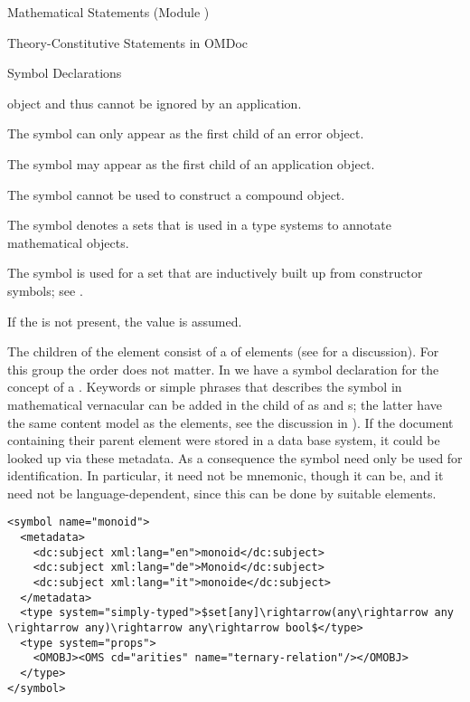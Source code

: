 \begin{tchapter}[id=statements,short=Mathematical Statements]{Mathematical Statements (Module {})}
\begin{tsection}[id=definitions]{Theory-Constitutive Statements in OMDoc}
\begin{tsubsection}[id=symbol-dec]{Symbol Declarations}
\begin{description}
    {\openmath} object and thus cannot be ignored by an application.
  \item[{\attval{error}{role}{symbol}}] The symbol can only appear as the first child of
    an {\openmath} error object.
  \item[{\attval{application}{role}{symbol}}] The symbol may appear as the first child of
    an application object.
  \item[{\attval{constant}{role}{symbol}}] The symbol cannot be used to construct a
    compound object.
  \item[{\attval{type}{role}{symbol}}] The symbol denotes a sets that is used in a type
    systems to annotate mathematical objects.
  \item[{\attval{sort}{role}{symbol}}] The symbol is used for a set that are inductively
    built up from constructor symbols; see {}.
  \end{description}
  If the {} is not present, the value
  {} is assumed.

  The children of the {} element consist of a
  {} of {} elements (see
  {} for a discussion). For this group the order does not matter.
  In {} we have a symbol declaration for the concept of a
  {}.  Keywords or simple phrases that describes the symbol in
  mathematical vernacular can be added in the {} child of
  {} as {} and
  {s}; the latter have the same content model as the
  {} elements, see the discussion in {}). If the document
  containing their parent {} element were stored in a data base system, it
  could be looked up via these metadata. As a consequence the symbol
  {} need only be used for identification. In particular, it need
  not be mnemonic, though it can be, and it need not be language-dependent, since this can
  be done by suitable {} elements.

\begin{lstlisting}[label=lst:symbol,mathescape,
  caption={An {\omdoc} {\element{symbol}} Declaration},
  index={symbol,type}]
<symbol name="monoid">
  <metadata>
    <dc:subject xml:lang="en">monoid</dc:subject>
    <dc:subject xml:lang="de">Monoid</dc:subject>
    <dc:subject xml:lang="it">monoide</dc:subject>
  </metadata>
  <type system="simply-typed">$set[any]\rightarrow(any\rightarrow any \rightarrow any)\rightarrow any\rightarrow bool$</type>
  <type system="props">
    <OMOBJ><OMS cd="arities" name="ternary-relation"/></OMOBJ>
  </type>
</symbol>
\end{lstlisting}
\end{tsubsection}


\end{tsection}
\end{tchapter}

